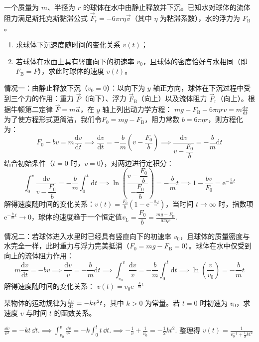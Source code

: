 \documentclass[lang=cn,11pt]{elegantbook}
\begin{document}
\begin{example}
一个质量为 $m$、半径为 $r$ 的球体在水中由静止释放并下沉。已知水对球体的流体阻力满足斯托克斯黏滞公式 $\vec{F}_{\text{r}} = -6\pi r \eta \vec{v}$（其中 $\eta$ 为粘滞系数），水的浮力为 $F_{\text{B}}$。
\begin{enumerate}
\item 求球体下沉速度随时间的变化关系 $v(t)$；
\item 若球体在水面上具有竖直向下的初速率 $v_0$，且球体的密度恰好与水相同（即 $F_{\text{B}} = P$），求此时球体的速度 $v(t)$。
\end{enumerate}
\end{example}
\begin{solution}
情况一：由静止释放下沉（$v_0 = 0$）：以向下为 $y$ 轴正方向，球体在下沉过程中受到三个力的作用：重力 $\vec{P}$（向下）、浮力 $\vec{F}_{\text{B}}$（向上）以及流体阻力 $\vec{F}_{\text{r}}$（向上）。根据牛顿第二定律 $\vec{F} = m\vec{a}$，在 $y$ 轴上列出动力学方程：
 \(mg - F_{\text{B}} - 6\pi \eta r v = m\frac{\mathrm{d}v}{\mathrm{d}t}\) 
为了使方程形式更简洁，我们令$F_0 = mg - F_{\text{B}}$，阻力常数 $b = 6\pi \eta r$，则方程化为：
$$F_0 - bv = m\frac{\mathrm{d}v}{\mathrm{d}t}\implies\frac{\mathrm{d}v}{\mathrm{d}t} = -\frac{b}{m}\left(v - \frac{F_0}{b}\right) \implies \frac{\mathrm{d}v}{v - \dfrac{F_0}{b}} = -\frac{b}{m}\mathrm{d}t$$
结合初始条件（$t=0$ 时，$v=0$），对两边进行定积分：
$$\int_{0}^{v} \frac{\mathrm{d}v}{v - \dfrac{F_0}{b}} = -\frac{b}{m}\int_{0}^{t}\mathrm{d}t\implies\ln\left( \frac{v - \dfrac{F_0}{b}}{-\dfrac{F_0}{b}} \right) = -\frac{b}{m}t \implies 1 - \frac{bv}{F_0} = \mathrm{e}^{-\frac{b}{m}t}$$
解得速度随时间的变化关系：$v(t) = \frac{F_0}{b}\left(1 - \mathrm{e}^{-\frac{b}{m}t}\right)$，当时间 $t \to \infty$ 时，指数项 $\mathrm{e}^{-\frac{b}{m}t} \to 0$，球体的速度趋于一个恒定值$v_{\text{L}} = \dfrac{F_0}{b} = \frac{mg - F_{\text{B}}}{6\pi \eta r}$.

情况二：若球体进入水里时已经具有竖直向下的初速率 $v_0$，且球体的质量密度与水完全一样，此时重力与浮力完美抵消（$F_0 = mg - F_{\text{B}} = 0$）。球体在水中仅受到向上的流体阻力作用：$$m\frac{\mathrm{d}v}{\mathrm{d}t} = -bv \implies \frac{\mathrm{d}v}{v} = -\frac{b}{m}\mathrm{d}t\implies\int_{v_0}^{v} \frac{\mathrm{d}v}{v} = -\frac{b}{m}\int_{0}^{t}\mathrm{d}t \implies \ln\left(\frac{v}{v_0}\right) = -\frac{b}{m}t$$解得速度随时间的变化关系： \(v(t) = v_0\mathrm{e}^{-\frac{b}{m}t}\) 
\end{solution}


\begin{exercise}
某物体的运动规律为$\dv{v}{t}=-kv^2t$，其中 \(k>0\) 为常量。若 \(t=0\) 时初速为 \(v_0\)，求速度 \(v\) 与时间 \(t\) 的函数关系。
\end{exercise}
\begin{solution}
 \(\frac{\dd v}{v^2}=-kt\,\dd t.\implies \int_{v_0}^{v}\frac{\dd v}{v^2} =-k\int_0^t t\,\dd t. \implies -\frac{1}{v}+\frac{1}{v_0} =-\frac12kt^2.\) 
整理得
 \(v(t)=\frac{1}{v_0^{-1}+\frac12kt^2}\) 
\end{solution}
\end{document}
